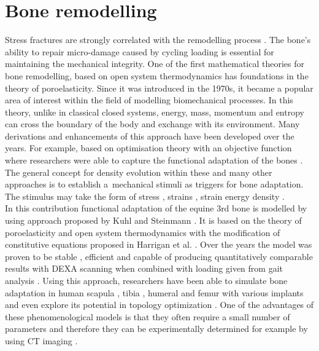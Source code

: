 \documentclass[11pt]{acmeArticle}
\numberwithin{equation}{section}
\begin{document}
\section{Bone remodelling} 
\label{sec:bone_remodel}
Stress fractures are strongly correlated with the remodelling process \citep{hughes2017role}. The bone's ability to repair micro-damage caused by cycling loading is essential for maintaining the mechanical integrity. One of the first mathematical theories for bone remodelling, based on open system thermodynamics \citep{cowin1976bone} has foundations in the theory of poroelasticity. Since it was introduced in the 1970s, it became a popular area of interest within the field of modelling biomechanical processes. In this theory, unlike in classical closed systems, energy, mass, momentum and entropy can cross the boundary of the body and exchange with its environment. Many derivations and enhancements of this approach have been developed over the years. 
For example, based on optimisation theory with an objective function where researchers were able to capture the functional adaptation of the bones \citep{harrigan1996bone, jacobs1995numerical, weinans1992behavior}.
The general concept for density evolution within these and many other approaches is to establish a~mechanical stimuli as triggers for bone adaptation. The stimulus may take the form of stress \citep{beaupre1990approach, carter1996mechanical, doblare2002anisotropic}, strains \citep{cowin1976bone}, strain energy density \citep{weinans1992behavior, kuhl2003theory,kaczmarczyk2011efficient, Connor2017bone}. \\ 
In this contribution functional adaptation of the equine 3rd bone is modelled by using approach proposed by Kuhl and Steinmann \citep{kuhl2003theory}. It is based on the theory of poroelasticity and open system thermodynamics with the modification of constitutive equations proposed in Harrigan et al. \citep{harrigan1996bone}. Over the years the model was proven to be stable \citep{kuhl2003computational}, efficient \citep{kaczmarczyk2011efficient} and capable of producing quantitatively comparable results with DEXA scanning when combined with loading given from gait analysis \citep{pang2012computational}. Using this approach, researchers have been able to simulate bone adaptation in human scapula \citep{liedtke2017computational}, tibia \citep{pang2012computational}, humeral \citep{taylor2009phenomenon} and femur with various implants \citep{ambrosi2011perspectives, Connor2017bone} and even explore its potential in topology optimization \citep{waffenschmidt2012application}. One of the advantages of these phenomenological models is that they often require a small number of parameters and therefore they can be experimentally determined for example by using CT imaging \citep{zadpoor2013open}.\\ 
\end{document}
